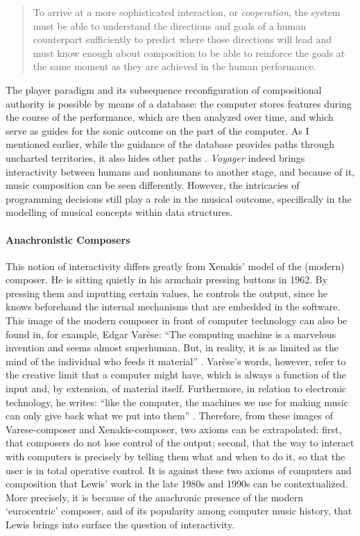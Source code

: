 \begin{quote}
	To arrive at a more sophisticated interaction, or \textit{cooperation}, the system must be able to understand the directions and goals of a human counterpart sufficiently to predict where those directions will lead and must know enough about composition to be able to reinforce the goals at the same moment as they are achieved in the human performance. \parencite[Chapter~8]{Row92:Int}
\end{quote}

The player paradigm and its subsequence reconfiguration of compositional authority is possible by means of a database: the computer stores features during the course of the performance, which are then analyzed over time, and which serve as guides for the sonic outcome on the part of the computer. As I mentioned earlier, while the guidance of the database provides paths through uncharted territories, it also hides other paths . \textit{Voyager} indeed brings interactivity between humans and nonhumans to another stage, and because of it, music composition can be seen differently. However, the intricacies of programming decisions still play a role in the musical outcome, specifically in the modelling of musical concepts within data structures.

\paragraph{Anachronistic Composers}
This notion of interactivity differs greatly from Xenakis' model of the (modern) composer. He is sitting quietly in his armchair pressing buttons in 1962. By pressing them and inputting certain values, he controls the output, since he knows beforehand the internal mechanisms that are embedded in the software. This image of the modern composer in front of computer technology can also be found in, for example, Edgar Varèse: ``The computing machine is a marvelous invention and seems almost superhuman. But, in reality, it is as limited as the mind of the individual who feeds it material'' \parencite[20]{Var04:The}. Varèse's words, however, refer to the creative limit that a computer might have, which is always a function of the input and, by extension, of material itself. Furthermore, in relation to electronic technology, he writes: ``like the computer, the machines we use for making music can only give back what we put into them'' \parencite[20]{Var04:The}. Therefore, from these images of Varese-composer and Xenakis-composer, two axioms can be extrapolated: first, that composers do not lose control of the output; second, that the way to interact with computers is precisely by telling them what and when to do it, so that the user is in total operative control. It is against these two axioms of computers and composition that Lewis' work in the late 1980s and 1990s can be contextualized. More precisely, it is because of the anachronic presence of the modern `eurocentric' composer, and of its popularity among computer music history, that Lewis brings into surface the question of interactivity. 

